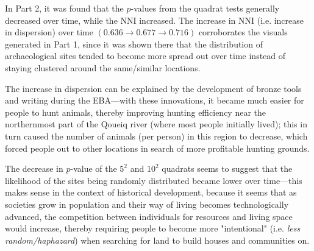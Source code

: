 \documentclass[answers]{exam}
\begin{document}
\begin{parts}
\quad\quad\color{nr}In Part 2, it was found that the $p$-values from the quadrat tests generally decreased over time, while the NNI increased. The increase in NNI (i.e. increase in dispersion) over time $(0.636\longrightarrow0.677\longrightarrow0.716)$ corroborates the visuals generated in Part 1, since it was shown there that the distribution of archaeological sites tended to become more spread out over time instead of staying clustered around the same/similar locations.

\quad\quad The increase in dispersion can be explained by the development of bronze tools and writing during the EBA---with these innovations, it became much easier for people to hunt animals, thereby improving hunting efficiency near the northernmost part of the Qoueiq river (where most people initially lived); this in turn caused the number of animals (per person) in this region to decrease, which forced people out to other locations in search of more profitable hunting grounds.

\quad\quad The decrease in $p$-value of the $5^2$ and $10^2$ quadrats seems to suggest that the likelihood of the sites being randomly distributed became lower over time---this makes sense in the context of historical development, because it seems that as societies grow in population and their way of living becomes technologically advanced, the competition between individuals for resources and living space would increase, thereby requiring people to become more "intentional" (i.e. \textit{less random/haphazard}) when searching for land to build houses and communities on.

\quad\quad
\end{parts}
\end{document}
